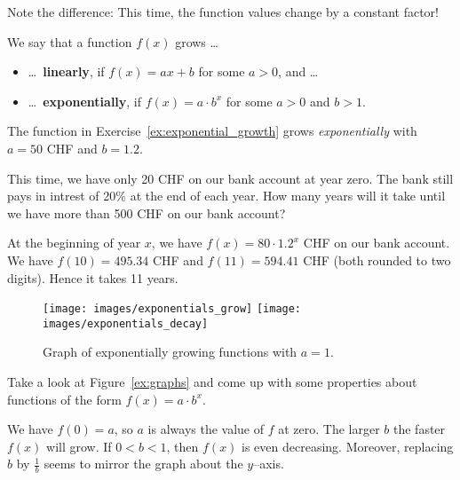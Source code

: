 \begin{tcolorbox}
	Note the difference: This time, the function values change by a constant factor!
\end{tcolorbox}
\newpage
\begin{tcolorbox}
	We say that a function $f\left(x\right)$ grows \ldots
	\begin{itemize}
		\item[] \ldots\ \textbf{linearly}, if $f\left(x\right)=ax+b$ for some $a>0$, and \ldots
		\item[] \ldots\ \textbf{exponentially}, if $f\left(x\right)=a\cdot b^x$ for some $a>0$ and $b>1$.
	\end{itemize}
\end{tcolorbox}
\begin{example}
	The function in Exercise~\ref{ex:exponential_growth} grows \textit{exponentially} with $a=50$ CHF and $b=1.2$.
\end{example}
\begin{exercise} \label{ex:first_exponential_equation}
	This time, we have only 20 CHF on our bank account at year zero.
	The bank still pays in intrest of 20\% at the end of each year.
	How many years will it take until we have more than 500 CHF on our bank account?
\end{exercise}
\begin{solution*}
	At the beginning of year $x$, we have $f\left(x\right)=80\cdot 1.2^x$ CHF on our bank account.
	We have $f\left(10\right)=495.34$ CHF and $f\left(11\right)=594.41$ CHF (both rounded to two digits).
	Hence it takes 11 years.
\end{solution*}
\begin{figure}[ht]
	\centering
	\texttt{[image: images/exponentials\_grow]}\hfill
	\texttt{[image: images/exponentials\_decay]}
	\caption{Graph of exponentially growing functions with $a=1$.}
	\label{fig:graphs}
\end{figure}
\begin{exercise} \label{ex:graphs}
	Take a look at Figure~\ref{ex:graphs} and come up with some properties about functions of the form $f\left(x\right)=a\cdot b^x$.
\end{exercise}
\begin{solution*}
	We have $f\left(0\right)=a$, so $a$ is always the value of $f$ at zero.
	The larger $b$ the faster $f\left(x\right)$ will grow.
	If $0<b<1$, then $f\left(x\right)$ is even decreasing.
	Moreover, replacing $b$ by $\frac{1}{b}$ seems to mirror the graph about the $y$--axis.
\end{solution*}
